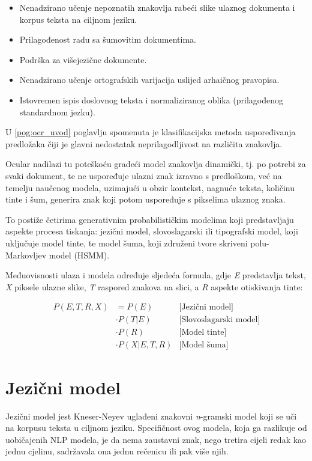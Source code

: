 \documentclass[zavrsnirad]{fer}
\begin{document}
\begin{itemize}
	\item Nenadzirano učenje nepoznatih znakovlja rabeći slike ulaznog dokumenta i korpus teksta na ciljnom jeziku.
	\item Prilagođenost radu sa šumovitim dokumentima.
	\item Podrška za višejezične dokumente.
	\item Nenadzirano učenje ortografskih varijacija uslijed arhaičnog pravopisa.
	\item Istovremen ispis doslovnog teksta i normaliziranog oblika (prilagođenog standardnom jezku).
\end{itemize}

U \ref{pog:ocr_uvod} poglavlju spomenuta je klasifikacijska metoda uspoređivanja predložaka čiji je glavni nedostatak neprilagodljivost na različita znakovlja.

Ocular nadilazi tu poteškoću gradeći model znakovlja dinamički, tj. po potrebi za svaki dokument, te ne uspoređuje ulazni znak izravno s predloškom, već na temelju naučenog modela, uzimajući u obzir kontekst, nagnuće teksta, količinu tinte i šum, generira znak koji potom uspoređuje s pikselima ulaznog znaka.

To postiže četirima generativnim probabilističkim modelima koji predstavljaju aspekte procesa tiskanja: jezični model, slovoslagarski ili tipografski model, koji uključuje model tinte, te model šuma, koji združeni tvore skriveni polu-Markovljev model (HSMM).

Međuovisnosti ulaza i modela određuje sljedeća formula, \cite{Berg2013} gdje \textit{E} predstavlja tekst, \textit{X} piksele ulazne slike, \textit{T} raspored znakova na slici, a \textit{R} aspekte otiskivanja tinte:

\[
\begin{aligned}
	P(E, T, R, X) &= P(E) & \text{[Jezični model]} \\
	&\cdot P(T | E) & \text{[Slovoslagarski model]} \\
	&\cdot P(R) & \text{[Model tinte]} \\
	&\cdot P(X | E, T, R) & \text{[Model šuma]}
\end{aligned}
\]

\section{Jezični model}

Jezični model jest Kneser-Neyev uglađeni znakovni \textit{n}-gramski model \cite{Kneser1995} koji se uči na korpusu teksta u ciljnom jeziku. Specifičnost ovog modela, koja ga razlikuje od uobičajenih NLP modela, je da nema zaustavni znak, nego tretira cijeli redak kao jednu cjelinu, sadržavala ona jednu rečenicu ili pak više njih.
\end{document}
